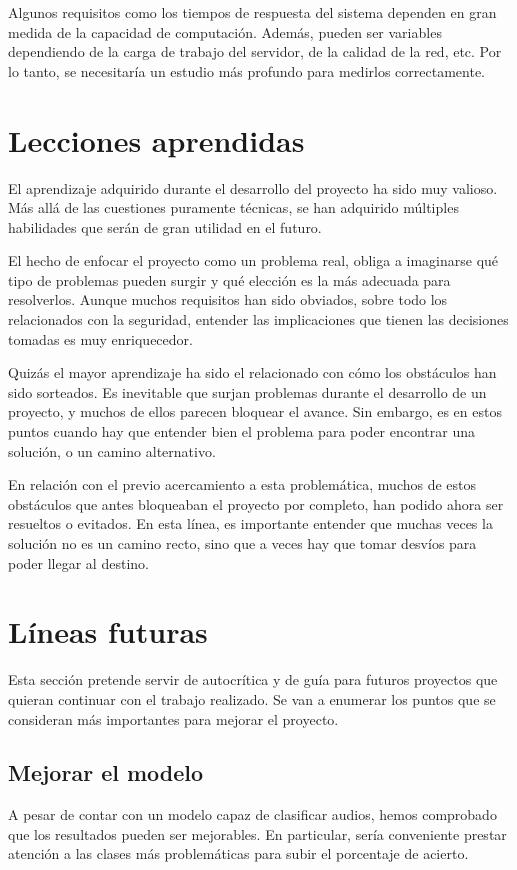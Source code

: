 Algunos requisitos como los tiempos de respuesta del sistema dependen en gran medida de la capacidad de computación.
Además, pueden ser variables dependiendo de la carga de trabajo del servidor, de la calidad de la red, etc.
Por lo tanto, se necesitaría un estudio más profundo para medirlos correctamente.


\section{Lecciones aprendidas}
El aprendizaje adquirido durante el desarrollo del proyecto ha sido muy valioso.
Más allá de las cuestiones puramente técnicas, se han adquirido múltiples habilidades que serán de gran utilidad en el futuro.

El hecho de enfocar el proyecto como un problema real, obliga a imaginarse qué tipo de problemas pueden surgir y qué elección es la más adecuada para resolverlos.
Aunque muchos requisitos han sido obviados, sobre todo los relacionados con la seguridad, entender las implicaciones que tienen las decisiones tomadas es muy enriquecedor.

Quizás el mayor aprendizaje ha sido el relacionado con cómo los obstáculos han sido sorteados.
Es inevitable que surjan problemas durante el desarrollo de un proyecto, y muchos de ellos parecen bloquear el avance.
Sin embargo, es en estos puntos cuando hay que entender bien el problema para poder encontrar una solución, o un camino alternativo.

En relación con el previo acercamiento a esta problemática, muchos de estos obstáculos que antes bloqueaban el proyecto por completo, han podido ahora ser resueltos o evitados.
En esta línea, es importante entender que muchas veces la solución no es un camino recto, sino que a veces hay que tomar desvíos para poder llegar al destino.


\section{Líneas futuras}

Esta sección pretende servir de autocrítica y de guía para futuros proyectos que quieran continuar con el trabajo realizado.
Se van a enumerar los puntos que se consideran más importantes para mejorar el proyecto.


\subsection{Mejorar el modelo}
A pesar de contar con un modelo capaz de clasificar audios, hemos comprobado que los resultados pueden ser mejorables.
En particular, sería conveniente prestar atención a las clases más problemáticas para subir el porcentaje de acierto.

